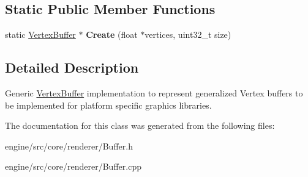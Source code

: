 \subsection*{Static Public Member Functions}
\begin{DoxyCompactItemize}
\item 
\mbox{\label{classengine_1_1renderer_1_1VertexBuffer_ad7590ff8837ebcf2ed645f4a379e04d8}} 
static \hyperlink{classengine_1_1renderer_1_1VertexBuffer}{Vertex\+Buffer} $\ast$ {\bfseries Create} (float $\ast$vertices, uint32\+\_\+t size)
\end{DoxyCompactItemize}


\subsection{Detailed Description}
Generic \hyperlink{classengine_1_1renderer_1_1VertexBuffer}{Vertex\+Buffer} implementation to represent generalized Vertex buffers to be implemented for platform specific graphics libraries. 

The documentation for this class was generated from the following files\+:\begin{DoxyCompactItemize}
\item 
engine/src/core/renderer/Buffer.\+h\item 
engine/src/core/renderer/Buffer.\+cpp\end{DoxyCompactItemize}

